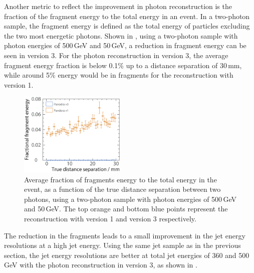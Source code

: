 Another metric to reflect the improvement in photon reconstruction is the fraction of the fragment energy to the total energy in an event. In a two-photon sample, the fragment energy is defined as the total energy of particles excluding the two most energetic photons. Shown in , using a two-photon sample with photon energies of  500\,GeV and 50\,GeV, a reduction in fragment energy can be seen in \pandora version 3. For the photon reconstruction in \pandora version 3, the average fragment energy fraction is below 0.1\% up to a distance separation of  30\,mm, while around 5\% energy would be in fragments for the reconstruction with \pandora version 1.
\begin{figure}[tbph]
\centering
\includegraphics[width=0.45\textwidth]{photon/DoubleCompareFragEnergy4}
\caption[Average fraction fragments energy to the total energy, as a function of the MC distance separation]
{Average fraction of fragments energy to the total energy  in the event, as a function of the true distance separation between two photons, using a two-photon sample with photon energies of  500\,GeV and 50\,GeV. The top orange and bottom blue points represent the reconstruction with \pandora version 1 and version 3 respectively. }
\label{fig:photonDoubleFragEnergy}
\end{figure}



The reduction in the fragments leads to a small improvement in the jet energy resolutions at a high jet energy. Using the same jet sample as in the previous section, the jet energy resolutions are better at total jet energies of 360 and 500\,GeV with the  photon reconstruction in \pandora version 3, as shown in .





